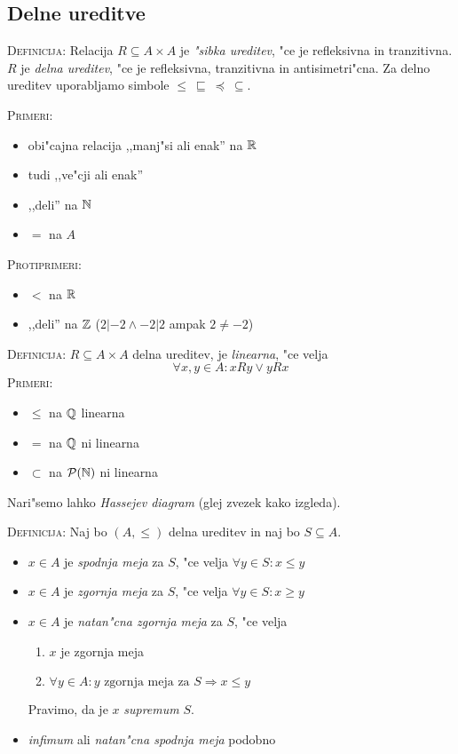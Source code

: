 \subsection{Delne ureditve}
\textsc{Definicija:} Relacija $R \subseteq A \times A$ je \emph{"sibka ureditev}, "ce je refleksivna in tranzitivna. $R$ je \emph{delna ureditev}, "ce je refleksivna, tranzitivna in antisimetri"cna. Za delno ureditev uporabljamo simbole $\leq\ \sqsubseteq\ \preccurlyeq\ \subseteq$.

\textsc{Primeri:}
\begin{itemize}
	\item obi"cajna relacija  ,,manj"si ali enak'' na $\mathbb{R}$
	\item tudi ,,ve"cji ali enak''
	\item ,,deli'' na $\mathbb{N}$
	\item $=$ na $A$
\end{itemize}
\textsc{Protiprimeri:}
\begin{itemize}
	\item $<$ na $\mathbb{R}$
	\item ,,deli'' na $\mathbb{Z}$ ($2 | -2 \land -2 | 2$ ampak $2 \neq -2$)
\end{itemize}
%
\textsc{Definicija:} $R \subseteq A \times A$ delna ureditev, je \emph{linearna}, "ce velja
\begin{equation*}
\forall x,y \in A: x R y \lor y R x
\end{equation*}
\textsc{Primeri:}
\begin{itemize}
	\item $\leq$ na $\mathbb{Q}$ linearna
	\item $=$ na $\mathbb{Q}$ ni linearna
	\item $\subset$ na $\mathcal{P}(\mathbb{N})$ ni linearna
\end{itemize}
Nari"semo lahko \emph{Hassejev diagram} (glej zvezek kako izgleda).

\textsc{Definicija:} Naj bo $(A, \leq)$ delna ureditev in naj bo $S \subseteq A$.
\begin{itemize}
	\item $x \in A$ je \emph{spodnja meja} za $S$, "ce velja $\forall y \in S: x \leq y$
	\item $x \in A$ je \emph{zgornja meja} za $S$, "ce velja $\forall y \in S: x \geq y$
	\item $x \in A$ je \emph{natan"cna zgornja meja} za $S$, "ce velja
	\begin{enumerate}
		\item $x$ je zgornja meja
		\item $\forall y \in A: y \text{ zgornja meja za $S$} \Rightarrow x \leq y$
	\end{enumerate}
	Pravimo, da je $x$ \emph{supremum} $S$.
	\item \emph{infimum} ali \emph{natan"cna spodnja meja} podobno
\end{itemize}